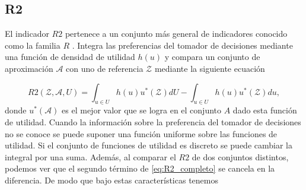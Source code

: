 

\subsection{R2} \label{sec:R2}
El indicador $R2$ pertenece a un conjunto más general de indicadores conocido como la familia $R$ \cite{R2}. Integra las preferencias del tomador de decisiones mediante una función de densidad de utilidad $h(u)$ y compara un conjunto de aproximación $\mathcal{A}$ con uno de referencia $\mathcal{Z}$ mediante la siguiente ecuación

\begin{equation} \label{eq:R2_completo}
    R2(\mathcal{Z},\mathcal{A},U)=\int_{u\in U} h(u)u^*(\mathcal{Z}) dU- \int_{u\in U} h(u) u^*(\mathcal{Z})du, 
\end{equation}
donde  $u^*(\mathcal{A})$ es el mejor valor que se logra en el conjunto $A$ dado esta función de utilidad. Cuando la información sobre la preferencia del tomador de decisiones no se conoce se puede suponer una función uniforme sobre las funciones de utilidad. Si el conjunto de funciones de utilidad es discreto se puede cambiar la integral por una suma. Además, al comparar el $R2$ de dos conjuntos distintos, podemos ver que el segundo término de \ref{eq:R2_completo} se cancela en la diferencia. De modo que bajo estas características tenemos

